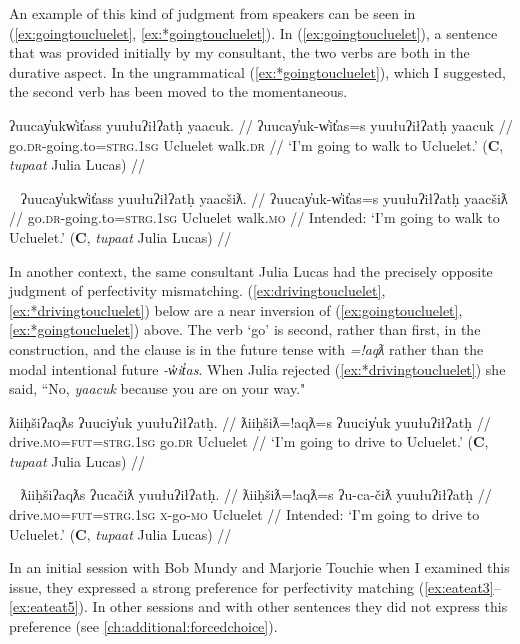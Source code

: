 An example of this kind of judgment from speakers can be seen in (\ref{ex:goingtoucluelet}, \ref{ex:*goingtoucluelet}). In (\ref{ex:goingtoucluelet}), a sentence that was provided initially by my consultant, the two verbs are both in the durative aspect. In the ungrammatical (\ref{ex:*goingtoucluelet}), which I suggested, the second verb has been moved to the momentaneous.

\ex \label{ex:goingtoucluelet}
\begingl
\glpreamble ʔuucay̓ukw̓it̓ass yuułuʔiłʔatḥ yaacuk. //
\gla ʔuucay̓uk-w̓it̓as=s yuułuʔiłʔatḥ yaacuk //
\glb go.\textsc{dr}-going.to=\textsc{strg.1sg} Ucluelet walk.\textsc{dr} //
\glft `I'm going to walk to Ucluelet.' (\textbf{C}, \textit{tupaat} Julia Lucas) //
\endgl
\xe

\ex~ \label{ex:*goingtoucluelet}
\begingl
\glpreamble *ʔuucay̓ukw̓it̓ass yuułuʔiłʔatḥ yaacšiƛ. //
\gla ʔuucay̓uk-w̓it̓as=s yuułuʔiłʔatḥ yaacšiƛ //
\glb go.\textsc{dr}-going.to=\textsc{strg.1sg} Ucluelet walk.\textsc{mo} //
\glft Intended: `I'm going to walk to Ucluelet.' (\textbf{C}, \textit{tupaat} Julia Lucas) //
\endgl
\xe

In another context, the same consultant Julia Lucas had the precisely opposite judgment of perfectivity mismatching. (\ref{ex:drivingtoucluelet}, \ref{ex:*drivingtoucluelet}) below are a near inversion of (\ref{ex:goingtoucluelet}, \ref{ex:*goingtoucluelet}) above. The verb `go' is second, rather than first, in the construction, and the clause is in the future tense with \textit{=!aqƛ} rather than the modal intentional future \textit{-w̓it̓as}.  When Julia rejected (\ref{ex:*drivingtoucluelet}) she said, ``No, \textit{yaacuk} because you are on your way."

\ex \label{ex:drivingtoucluelet}
\begingl
\glpreamble ƛiiḥšiʔaqƛs ʔuuciy̓uk yuułuʔiłʔatḥ. //
\gla ƛiiḥšiƛ=!aqƛ=s ʔuuciy̓uk yuułuʔiłʔatḥ //
\glb drive.\textsc{mo}=\textsc{fut}=\textsc{strg.1sg} go.\textsc{dr} Ucluelet //
\glft `I'm going to drive to Ucluelet.' (\textbf{C}, \textit{tupaat} Julia Lucas) //
\endgl
\xe

\ex~ \label{ex:*drivingtoucluelet}
\begingl
\glpreamble *ƛiiḥšiʔaqƛs ʔucačiƛ yuułuʔiłʔatḥ. //
\gla ƛiiḥšiƛ=!aqƛ=s ʔu-ca-čiƛ yuułuʔiłʔatḥ //
\glb drive.\textsc{mo}=\textsc{fut}=\textsc{strg.1sg} \textsc{x}-go-\textsc{mo} Ucluelet //
\glft Intended: `I'm going to drive to Ucluelet.' (\textbf{C}, \textit{tupaat} Julia Lucas) //
\endgl
\xe

In an initial session with Bob Mundy and Marjorie Touchie when I examined this issue, they expressed a strong preference for perfectivity matching (\ref{ex:eateat3}--\ref{ex:eateat5}). In other sessions and with other sentences they did not express this preference (see \cref{ch:additional:forcedchoice}).

